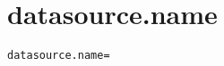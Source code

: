 \section{datasource.name}
\label{configuration:DatasourceName}
\ClearAPI
\TODO
{}
\begin{lstlisting}[style=Props,caption={Usage example for \textit{datasource.name}}]
datasource.name=
\end{lstlisting}